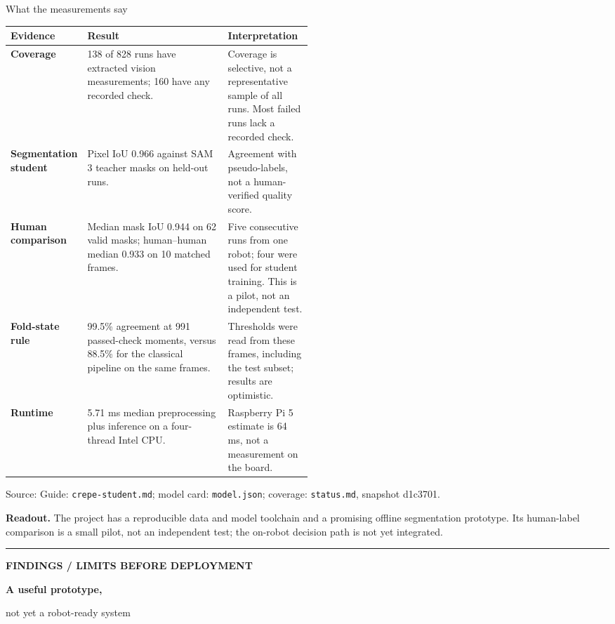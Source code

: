\documentclass[10pt,a4paper]{article}
\makeatletter
\renewcommand\section{\@startsection{section}{1}{0pt}{9pt}{5pt}%
  {\normalfont\large\bfseries\color{ink}}}
\newcommand{\tagline}[1]{{\color{teal}\small\bfseries\MakeUppercase{#1}}}
\newcommand{\source}[1]{{\color{muted}\scriptsize Source: #1\par}}
\makeatother
\begin{document}
\section{What the measurements say}
\begin{tabularx}{\linewidth}{@{}
  >{\raggedright\arraybackslash\bfseries}p{0.22\linewidth}
  X
  >{\raggedright\arraybackslash}p{0.28\linewidth}@{}}
\toprule
Evidence & Result & Interpretation \\
\midrule
Coverage & 138 of 828 runs have extracted vision measurements; 160 have any
recorded check. & Coverage is selective, not a representative sample of all
runs. Most failed runs lack a recorded check. \\
Segmentation student & Pixel IoU 0.966 against SAM 3 teacher masks on held-out
runs. & Agreement with pseudo-labels, not a human-verified quality score. \\
Human comparison & Median mask IoU 0.944 on 62 valid masks; human--human median
0.933 on 10 matched frames. & Five consecutive runs from one robot; four were
used for student training. This is a pilot, not an independent test. \\
Fold-state rule & 99.5\% agreement at 991 passed-check moments, versus 88.5\%
for the classical pipeline on the same frames. & Thresholds were read from
these frames, including the test subset; results are optimistic. \\
Runtime & 5.71 ms median preprocessing plus inference on a four-thread Intel
CPU. & Raspberry Pi 5 estimate is 64 ms, not a measurement on the board. \\
\bottomrule
\end{tabularx}
\vspace{2pt}
\source{Guide: \texttt{crepe-student.md}; model card: \texttt{model.json};
coverage: \texttt{status.md}, snapshot d1c3701.}
\vspace{7pt}
\colorbox{coralLight}{\parbox{\dimexpr\linewidth-2\fboxsep}{\small
\textbf{Readout.} The project has a reproducible data and model toolchain and a
promising offline segmentation prototype. Its human-label comparison is a
small pilot, not an independent test; the on-robot decision path is not yet
integrated.}}

\newpage
\thispagestyle{fancy}
{\color{coral}\rule{\linewidth}{3pt}}\vspace{6pt}
\tagline{Findings \quad / \quad Limits before deployment}\par
\vspace{4pt}
{\fontsize{22}{25}\selectfont\bfseries A useful prototype,\par
not yet a robot-ready system}\par
\vspace{8pt}
\end{document}
